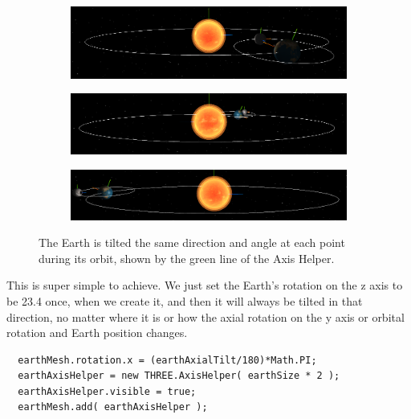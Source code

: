 \documentclass[12pt]{article}
\begin{document}
 \begin{figure}[H]
        \centering
        \begin{subfigure}[b]{0.5\textwidth}
                \includegraphics[width=\textwidth]{images/earthtilt1}
                \label{fig: Earth tilt1.}
	 \end{subfigure}
        \begin{subfigure}[b]{0.5\textwidth}
                \includegraphics[width=\textwidth]{images/earthtilt2}
                \label{fig: Earth tilt2.}
	 \end{subfigure}
	         \begin{subfigure}[b]{0.5\textwidth}
                \includegraphics[width=\textwidth]{images/earthtilt3}
                \label{fig: Earth tilt3.}
	 \end{subfigure}
	 \caption{The Earth is tilted the same direction and angle at each point during its orbit, shown by the green line of the Axis Helper.}
\end{figure}

This is super simple to achieve. We just set the Earth's rotation on the z axis to be 23.4 once, when we create it, and then it will always be tilted in that direction, no matter where it is or how the axial rotation on the y axis or orbital rotation and Earth position changes.

\begin{lstlisting}
  earthMesh.rotation.x = (earthAxialTilt/180)*Math.PI;
  earthAxisHelper = new THREE.AxisHelper( earthSize * 2 );
  earthAxisHelper.visible = true;
  earthMesh.add( earthAxisHelper );
\end{lstlisting}
\end{document}
